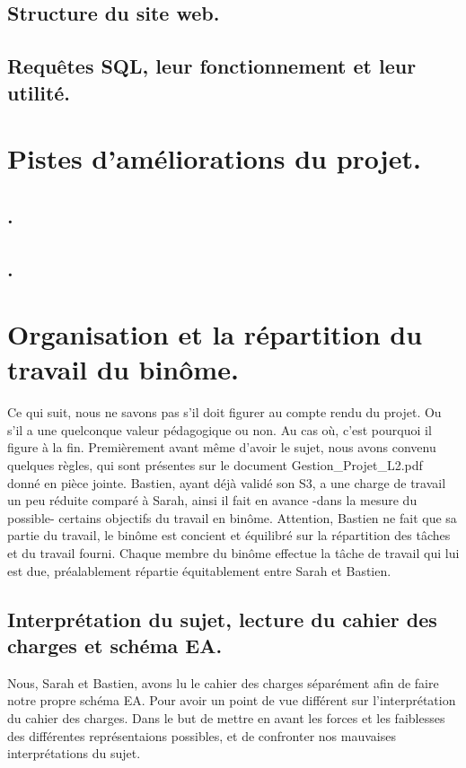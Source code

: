 \documentclass[12pt,a4paper]{article}
\begin{document}
\subsection{Structure du site web.}
\subsection{Requêtes SQL, leur fonctionnement et leur utilité.}
\section{Pistes d’améliorations du projet.}
\subsection{.}
\subsection{.}
\section{Organisation et la répartition du travail du binôme.}
Ce qui suit, nous ne savons pas s'il doit figurer au compte rendu du projet. Ou s'il a une quelconque valeur pédagogique ou non. Au cas où, c'est pourquoi il figure à la fin. 
Premièrement avant même d'avoir le sujet, nous avons convenu quelques règles, qui sont présentes sur le document Gestion_Projet_L2.pdf donné en pièce jointe. Bastien, ayant déjà validé son S3, a une charge de travail un peu réduite comparé à Sarah, ainsi il fait en avance -dans la mesure du possible- certains objectifs du travail en binôme. Attention, Bastien ne fait que sa partie du travail, le binôme est concient et équilibré sur la répartition des tâches et du travail fourni. Chaque membre du binôme effectue la tâche de travail qui lui est due, préalablement répartie équitablement entre Sarah et Bastien.
\subsection{Interprétation du sujet, lecture du cahier des charges et schéma EA.}
Nous, Sarah et Bastien, avons lu le cahier des charges séparément afin de faire notre propre schéma EA. Pour avoir un point de vue différent sur l'interprétation du cahier des charges. Dans le but de mettre en avant les forces et les faiblesses des différentes représentaions possibles, et de confronter nos mauvaises interprétations du sujet. 
\end{document}
